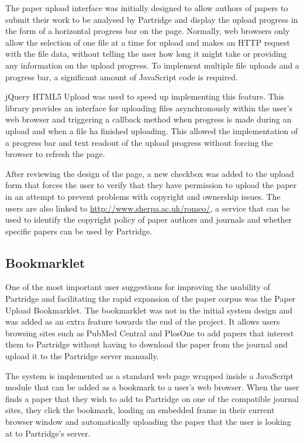 The paper upload interface was initially designed to allow authors of papers to
submit their work to be analysed by Partridge and display the upload progress
in the form of a horizontal progress bar on the page. Normally, web browsers
only allow the selection of one file at a time for upload and makes an HTTP
request with the file data, without telling the user how long it might take or
providing any information on the upload progress. To implement multiple file
uploads and a progress bar, a significant amount of JavaScript code is
required. 

jQuery HTML5 Upload was used to speed up implementing this feature. This
library provides an interface for uploading files asynchronously within the
user's web browser and triggering a callback method when progress is made
during an upload and when a file ha finished uploading. This allowed the
implementation of a progress bar and text readout of the upload progress
without forcing the browser to refresh the page.

After reviewing the design of the page, a new checkbox was added to the upload
form that forces the user to verify that they have permission to upload the
paper in an attempt to prevent problems with copyright and ownership issues.
The users are also linked to \url{http://www.sherpa.ac.uk/romeo/}, a service
that can be used to identify the copyright policy of paper authors and
journals and whether specific papers can be used by Partridge. 

\subsection{ Bookmarklet }

One of the most important user suggestions for improving the usability of
Partridge and facilitating the rapid expansion of the paper corpus was the
Paper Upload Bookmarklet. The bookmarklet was not in the initial system design
and was added as an extra feature towards the end of the project. It allows
users browsing sites such as PubMed Central and PlosOne to add papers that
interest them to Partridge without having to download the paper from the
journal and upload it to the Partridge server manually. 

The system is implemented as a standard web page wrapped inside a JavaScript
module that can be added as a bookmark to a user's web browser. When the user
finds a paper that they wish to add to Partridge on one of the compatible
journal sites, they click the bookmark, loading an embedded frame in their
current browser window and automatically uploading the paper that the user is
looking at to Partridge's server. 


